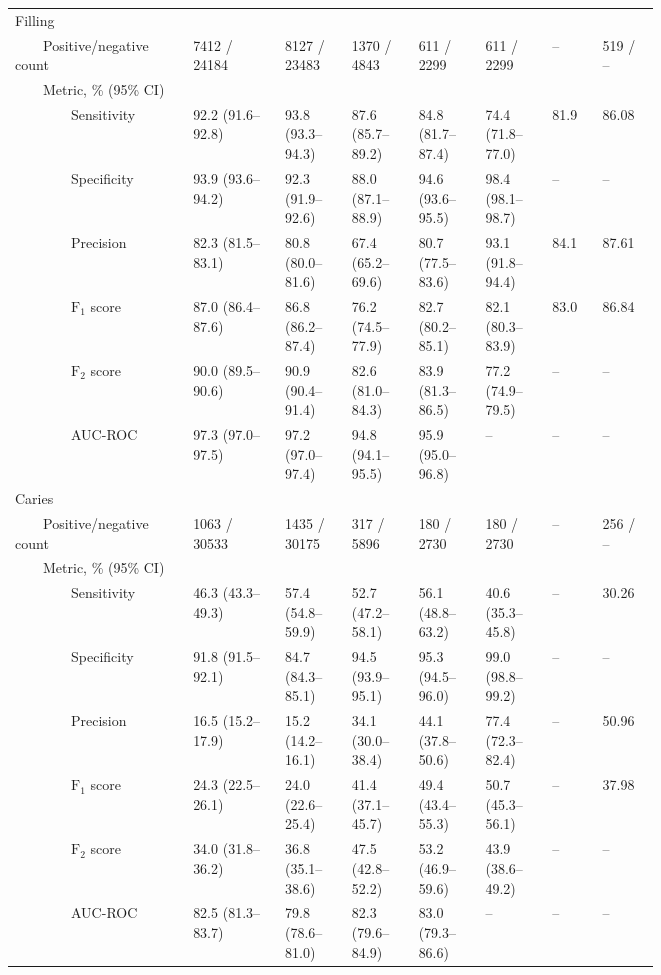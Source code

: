 \begin{table}[!h]
\begin{tabular}{ p{0.167\linewidth}p{0.117\linewidth}p{0.083\linewidth}p{0.083\linewidth}p{0.083\linewidth}p{0.083\linewidth}|p{0.067\linewidth}p{0.067\linewidth} }
Filling &   &   &   &   &   &   &   \\
{~~~~}Positive/negative count & \num{7412} / \num{24184} & \num{8127} / \num{23483} & \num{1370} / \num{4843} & \num{611} / \num{2299} & \num{611} / \num{2299} & -- & \num{519} / -- \\
{~~~~}Metric, \% (95\% CI) &   &   &   &   &   &   &   \\
{~~~~~~~~}Sensitivity & 92.2 {(91.6--92.8)} & 93.8 {(93.3--94.3)} & 87.6 {(85.7--89.2)} & 84.8 {(81.7--87.4)} & 74.4 {(71.8--77.0)} & 81.9 & 86.08 \\
{~~~~~~~~}Specificity & 93.9 {(93.6--94.2)} & 92.3 {(91.9--92.6)} & 88.0 {(87.1--88.9)} & 94.6 {(93.6--95.5)} & 98.4 {(98.1--98.7)} & -- & -- \\
{~~~~~~~~}Precision & 82.3 {(81.5--83.1)} & 80.8 {(80.0--81.6)} & 67.4 {(65.2--69.6)} & 80.7 {(77.5--83.6)} & 93.1 {(91.8--94.4)} & 84.1 & 87.61 \\
{~~~~~~~~}$\textrm{F}_1$ score & 87.0 {(86.4--87.6)} & 86.8 {(86.2--87.4)} & 76.2 {(74.5--77.9)} & 82.7 {(80.2--85.1)} & 82.1 {(80.3--83.9)} & 83.0 & 86.84 \\
{~~~~~~~~}$\textrm{F}_2$ score & 90.0 {(89.5--90.6)} & 90.9 {(90.4--91.4)} & 82.6 {(81.0--84.3)} & 83.9 {(81.3--86.5)} & 77.2 {(74.9--79.5)} & -- & -- \\
{~~~~~~~~}AUC-ROC & 97.3 {(97.0--97.5)} & 97.2 {(97.0--97.4)} & 94.8 {(94.1--95.5)} & 95.9 {(95.0--96.8)} & -- & -- & -- \\ \midrule

Caries &   &   &   &   &   &   &   \\
{~~~~}Positive/negative count & \num{1063} / \num{30533} & \num{1435} / \num{30175} & \num{317} / \num{5896} & \num{180} / \num{2730} & \num{180} / \num{2730} & -- & \num{256} / -- \\
{~~~~}Metric, \% (95\% CI) &   &   &   &   &   &   &   \\
{~~~~~~~~}Sensitivity & 46.3 {(43.3--49.3)} & 57.4 {(54.8--59.9)} & 52.7 {(47.2--58.1)} & 56.1 {(48.8--63.2)} & 40.6 {(35.3--45.8)} & -- & 30.26 \\
{~~~~~~~~}Specificity & 91.8 {(91.5--92.1)} & 84.7 {(84.3--85.1)} & 94.5 {(93.9--95.1)} & 95.3 {(94.5--96.0)} & 99.0 {(98.8--99.2)} & -- & -- \\
{~~~~~~~~}Precision & 16.5 {(15.2--17.9)} & 15.2 {(14.2--16.1)} & 34.1 {(30.0--38.4)} & 44.1 {(37.8--50.6)} & 77.4 {(72.3--82.4)} & -- & 50.96 \\
{~~~~~~~~}$\textrm{F}_1$ score & 24.3 {(22.5--26.1)} & 24.0 {(22.6--25.4)} & 41.4 {(37.1--45.7)} & 49.4 {(43.4--55.3)} & 50.7 {(45.3--56.1)} & -- & 37.98 \\
{~~~~~~~~}$\textrm{F}_2$ score & 34.0 {(31.8--36.2)} & 36.8 {(35.1--38.6)} & 47.5 {(42.8--52.2)} & 53.2 {(46.9--59.6)} & 43.9 {(38.6--49.2)} & -- & -- \\
{~~~~~~~~}AUC-ROC & 82.5 {(81.3--83.7)} & 79.8 {(78.6--81.0)} & 82.3 {(79.6--84.9)} & 83.0 {(79.3--86.6)} & -- & -- & -- \\ \midrule


\end{tabular}
\end{table}
